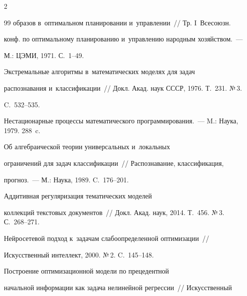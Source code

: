 \begin{multicols}{2}
{{\begin{thebibliography}{99}
образов в~оптимальном планировании и~управ\-ле\-нии~// Тр. I~Всесоюзн. 


конф. по оптимальному планированию и~управ\-ле\-нию народным хозяйством.~--- 


М.: ЦЭМИ, 1971. С.~1--49.









Экстремальные алгоритмы в~математических моделях для задач 


распознавания и~классификации~// Докл. Акад. наук СССР, 1976. Т.~231. №\,3. 


C.~532--535.









Нестационарные процессы математического программирования.~--- M.: Наука, 1979. 288~c.







 Об алгебраической теории универсальных и~локальных 


ограничений для задач классификации~// Распознавание, классификация, 


прогноз.~--- М.: Наука, 1989. C.~176--201.







 Аддитивная регуляризация тематических моделей 


коллекций текстовых документов~// Докл. Акад. наук, 2014. Т.~456. №\,3. С.~268--271.







 Нейросетевой подход к~задачам слабоопределенной оптимизации~// 


Искусственный интеллект, 2000. №\,2. C.~145--148.







 Построение оптимизационной модели по прецедентной 


начальной информации как задача нелинейной регрессии~// Искусственный 



\end{thebibliography}}}
\end{multicols}
